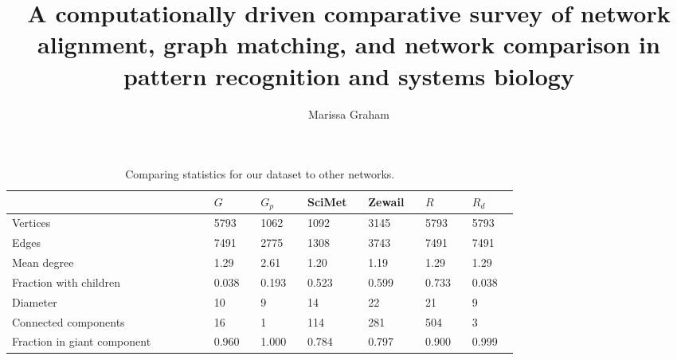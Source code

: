 \documentclass[12pt]{thesis}
\author{Marissa Graham}
\title{A computationally driven comparative survey of network alignment, graph matching, and network comparison in pattern recognition and systems biology}
\theoremstyle{plain}
\theoremstyle{definition}
\theoremstyle{remark}
\begin{document}
\frontmatter 
\maketitle 

\tableofcontents
\listoftables
\listoffigures
\mainmatter



\begin{table}[t!]
\centering
\begin{tabular}{|p{0.31\linewidth}||R{0.07\linewidth}|R{0.07\linewidth}|R{0.075\linewidth}|R{0.07\linewidth}|R{0.07\linewidth}|R{0.07\linewidth}|}
\hline
 & $G$ & $G_p$ & SciMet & Zewail & $R$ & $R_d$ \\ \hline\hline%
Vertices & 5793 & 1062 & 1092 & 3145 & 5793 & 5793 \\ \hline %
Edges & 7491 & 2775 & 1308 & 3743 & 7491 & 7491\\ \hline %
Mean degree & 1.29 & 2.61 & 1.20 & 1.19 & 1.29 & 1.29 \\ \hline %
Fraction with children & 0.038 & 0.193 & 0.523 & 0.599 & 0.733 & 0.038 \\ \hline %
Diameter & 10 & 9 & 14 & 22 & 21 & 9\\ \hline %
Connected components & 16 & 1 & 114 & 281 & 504 & 3 \\ \hline %
Fraction in giant component & 0.960 & 1.000 & 0.784 & 0.797 & 0.900 & 0.999 \\ \hline %
\end{tabular}
\caption{Comparing statistics for our dataset to other networks.}

\label{tab:network_table}
\end{table}
\end{document}
